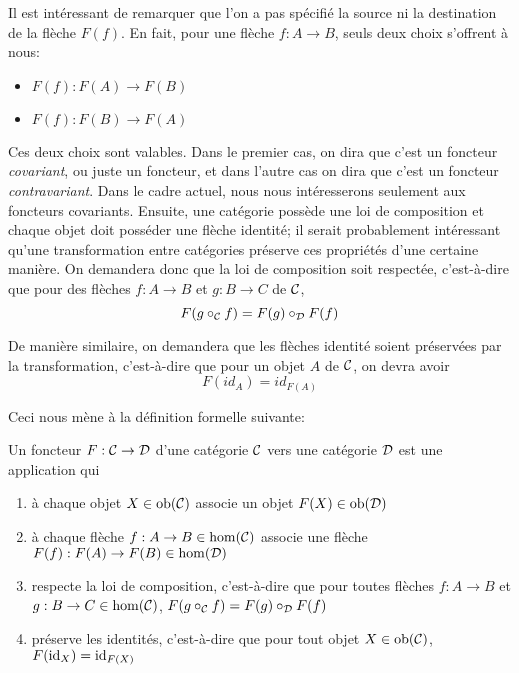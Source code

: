 Il est intéressant de remarquer que l'on a pas spécifié la source ni la
destination de la flèche $F(f)$. En fait, pour une flèche $f : A \to B$,
seuls deux choix s'offrent à nous:
\begin{itemize}
    \item $F(f) : F(A) \to F(B)$
    \item $F(f) : F(B) \to F(A)$
\end{itemize}

Ces deux choix sont valables. Dans le premier cas, on dira que c'est un
foncteur \textit{covariant}, ou juste un foncteur, et dans l'autre cas on
dira que c'est un foncteur \textit{contravariant}. Dans le cadre actuel,
nous nous intéresserons seulement aux foncteurs covariants. Ensuite, une
catégorie possède une loi de composition et chaque objet doit posséder une
flèche identité; il serait probablement intéressant qu'une transformation
entre catégories préserve ces propriétés d'une certaine manière. On demandera
donc que la loi de composition soit respectée, c'est-à-dire que pour des
flèches $f : A \to B$ et $g : B \to C$ de $\mathcal{C}$,
\[
    F(g \circ_{\mathcal{C}} f) = F(g) \circ_{\mathcal{D}} F(f)
\]

De manière similaire, on demandera que les flèches identité soient préservées
par la transformation, c'est-à-dire que pour un objet $A$ de $\mathcal{C}$, on devra
avoir
\[
    F(id_A) = id_{F(A)}
\]

Ceci nous mène à la définition formelle suivante:

\begin{définition}[Foncteur]
    Un foncteur $F : \mathcal{C} \to \mathcal{D}$ d'une catégorie $\mathcal{C}$ vers une catégorie $\mathcal{D}$
    est une application qui
    \begin{enumerate}
        \item à chaque objet $X \in \mathrm{ob}(\mathcal{C})$ associe un objet $F(X) \in \mathrm{ob}(\mathcal{D})$
        \item à chaque flèche $f : A \to B \in \hom(\mathcal{C})$ associe une flèche
              $F(f) : F(A) \to F(B) \in \hom(\mathcal{D})$
        \item respecte la loi de composition, c'est-à-dire que pour toutes
              flèches $f : A \to B$ et $g : B \to C \in \hom(\mathcal{C})$,
              $F(g \circ_{\mathcal{C}} f) = F(g) \circ_{\mathcal{D}} F(f)$
        \item préserve les identités, c'est-à-dire que pour tout objet
              $X \in \mathrm{ob}(\mathcal{C})$, $F(\mathrm{id}_X) = \mathrm{id}_{F(X)}$
    \end{enumerate}
\end{définition}


